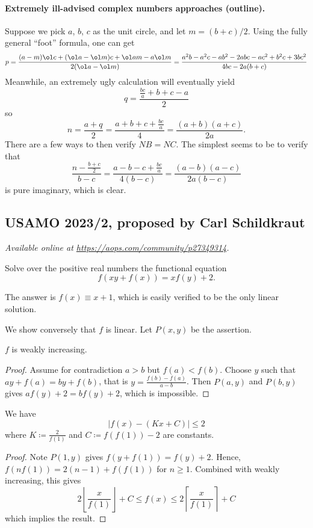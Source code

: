 \documentclass[11pt]{scrartcl}
\begin{document}
\paragraph{Extremely ill-advised complex numbers approaches (outline).}
Suppose we pick $a$, $b$, $c$ as the unit circle, and let $m = (b+c)/2$.
Using the fully general ``foot'' formula, one can get
\[
  p = \frac{(a-m) \ol c + (\ol a - \ol m)c
    + \ol a m - a \ol m}{2(\ol a - \ol m)}
    = \frac{a^2 b - a^2 c - a b^2 - 2 a b c - a c^2 + b^2 c + 3 b c^2}
    {4bc-2a(b+c)}
\]
Meanwhile, an extremely ugly calculation will eventually yield
\[ q = \frac{\frac{bc}{a}+b+c-a}{2} \]
so
\[ n = \frac{a+q}{2} = \frac{a+b+c+\frac{bc}{a}}{4}
  = \frac{(a+b)(a+c)}{2a}. \]
There are a few ways to then verify $NB = NC$.
The simplest seems to be to verify that
\[ \frac{n - \frac{b+c}{2}}{b-c} = \frac{a-b-c+\frac{bc}{a}}{4(b-c)}
  = \frac{(a-b)(a-c)}{2a(b-c)} \]
is pure imaginary, which is clear.
\pagebreak

\subsection{USAMO 2023/2, proposed by Carl Schildkraut}
\textsl{Available online at \url{https://aops.com/community/p27349314}.}
\begin{mdframed}[style=mdpurplebox,frametitle={Problem statement}]
Solve over the positive real numbers the functional equation
\[ f(xy+f(x)) = xf(y) + 2. \]
\end{mdframed}
The answer is $f(x) \equiv x+1$,
which is easily verified to be the only linear solution.

We show conversely that $f$ is linear. Let $P(x,y)$ be the assertion.

\begin{claim*}
  $f$ is weakly increasing.
\end{claim*}
\begin{proof}
  Assume for contradiction $a>b$ but $f(a)<f(b)$.
  Choose $y$ such that $ay+f(a)=by+f(b)$, that is $y=\frac{f(b)-f(a)}{a-b}$.
  Then $P(a,y)$ and $P(b,y)$ gives $af(y)+2=bf(y)+2$, which is impossible.
\end{proof}

\begin{claim*}
  We have
  \[ \left\lvert f(x) - (K x + C) \right\rvert \le 2 \]
  where $K \coloneqq \frac{2}{f(1)}$ and $C \coloneqq f(f(1))-2$ are constants.
\end{claim*}
\begin{proof}
  Note $P(1,y)$ gives $\boxed{f(y+f(1)) = f(y)+2}$.
  Hence, $f(nf(1)) = 2(n-1)+f(f(1))$ for $n \ge 1$.
  Combined with weakly increasing, this gives
  \[ 2\left\lfloor \frac{x}{f(1)} \right\rfloor + C
    \le f(x) \le 2\left\lceil \frac{x}{f(1)} \right\rceil + C \]
  which implies the result.
\end{proof}
\end{document}
